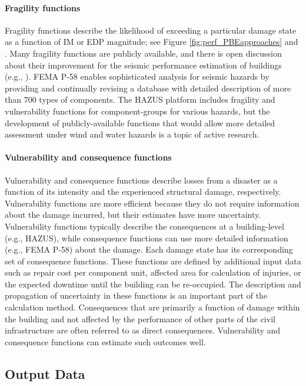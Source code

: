 \paragraph{Fragility functions} Fragility functions describe the likelihood of exceeding a particular damage state as a function of IM or EDP magnitude; see Figure \ref{fig:perf_PBEapproaches} and \citet{baker2021seismic}. Many fragility functions are publicly available, and there is open discussion about their improvement for the seismic performance estimation of buildings (e.g., \cite{silva2019current}). FEMA P-58 enables sophisticated analysis for seismic hazards by providing \citep{atc2012p-58} and continually revising \citep{atc2018p-58-1} a database with detailed description of more than 700 types of components. The HAZUS platform includes fragility and vulnerability functions for component-groups for various hazards, but the development of publicly-available functions that would allow more detailed assessment under wind and water hazards is a topic of active research.

\paragraph{Vulnerability and consequence functions} Vulnerability and consequence functions describe losses from a disaster as a function of its intensity and the experienced structural damage, respectively. Vulnerability functions are more efficient because they do not require information about the damage incurred, but their estimates have more uncertainty. Vulnerability functions typically describe the consequences at a building-level (e.g., HAZUS), while consequence functions can use more detailed information (e.g., FEMA P-58) about the damage. Each damage state has its corresponding set of consequence functions. These functions are defined by additional input data such as repair cost per component unit, affected area for calculation of injuries, or the expected downtime until the building can be re-occupied. The description and propagation of uncertainty in these functions is an important part of the calculation method. Consequences that are primarily a function of damage within the building and not affected by the performance of other parts of the civil infrastructure are often referred to as direct consequences. Vulnerability and consequence functions can estimate such outcomes well.

\subsection{Output Data}

